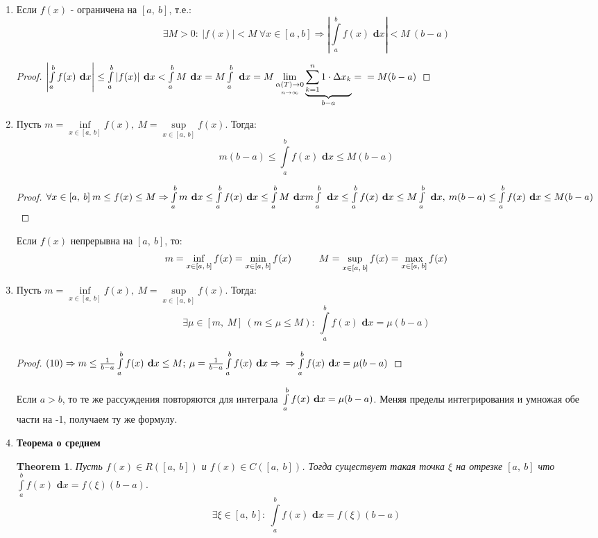 \documentclass[a4paper,12pt]{bookest}
\newtheorem{theorem}{Theorem}[section]
\theoremstyle{remark}
\newtheorem*{remark}{Remark}
\newcommand\tab[1][1cm]{\hspace*{#1}}
\newcommand\dx{\textbf{ d}x}
\begin{document}
\begin{enumerate}
\begin{proof}
	\end{proof}
	\begin{remark}
		Если $a>b;$ $$\left|\int\limits_{a}^{b}f(x)\dx\right|\leq\left|\int\limits_{a}^{b}|f(x)|\dx\right|$$
	\end{remark}
	\item Если $f(x)$ - ограничена на $[a,\>b]$, т.е.: $$\exists M>0:\>|f(x)|<M\>\forall x\in [a\>,b]\Rightarrow\left|\int\limits_a^bf(x)\dx\right|<M\>(b-a)$$
	\begin{proof}
	$\left|\int\limits_a^bf(x)\dx\right|\leq\int\limits_a^b|f(x)|\dx<\int\limits_a^bM\dx=M\int\limits_a^b\dx=M\lim\limits_{\underset{n\to\infty}{\alpha(T)\to0}}\underbrace{\sum\limits_{k=1}^n1\cdot\Delta x_k}_{b-a}=\\=M(b-a)$
	\end{proof}
	\item Пусть $m=\inf\limits_{x\in[a,\>b]}f(x),\>M=\sup\limits_{x\in[a,\>b]}f(x).$ Тогда:$$m(b-a)\leq\int\limits_{a}^{b}f(x)\dx\leq M(b-a)$$ \begin{proof}
		$\forall x\in[a,\>b]\>m\leq f(x)\leq M\Rightarrow\int\limits_{a}^{b}m\dx\leq \int\limits_{a}^{b}f(x)\dx\leq \int\limits_{a}^{b}M\dx\\m\int\limits_{a}^{b}\dx\leq\int\limits_{a}^{b}f(x)\dx\leq M\int\limits_{a}^{b}\dx,\>m(b-a)\leq \int\limits_{a}^{b}f(x)\dx\leq M(b-a)$
	\end{proof} 
	Если $f(x)$ непрерывна на $[a,\>b]$, то: $$m=\inf\limits_{x\in[a,\>b]}f(x)=\min\limits_{x\in[a,\>b]}f(x)\tab M=\sup\limits_{x\in[a,\>b]}f(x)=\max\limits_{x\in[a,\>b]}f(x)$$
	\item Пусть $m=\inf\limits_{x\in[a,\>b]}f(x),\>M=\sup\limits_{x\in[a,\>b]}f(x).$ Тогда: $$\exists\mu\in[m,\>M]\>(m\leq\mu\leq M):\>\int\limits_{a}^{b}f(x)\dx=\mu(b-a)$$ \begin{proof}
		$(10)\Rightarrow m\leq\frac1{b-a}\int\limits_{a}^{b}f(x)\dx\leq M;\>\mu=\frac1{b-a}\int\limits_{a}^{b}f(x)\dx\Rightarrow\\\Rightarrow\int\limits_{a}^{b}f(x)\dx=\mu(b-a)$
	\end{proof}
	Если $a>b$, то те же рассуждения повторяются для интеграла $\\\int\limits_{a}^{b}f(x)\dx=\mu(b-a)$. Меняя пределы интегрирования и умножая обе части на -1, получаем ту же формулу.
	\newpage
	\item \textbf{Теорема о среднем} \begin{theorem}
		Пусть $f(x)\in R([a,\>b])$ и $f(x)\in C([a,\>b])$. Тогда существует такая точка $\xi$ на отрезке $[a,\>b]$ что $\int\limits_{a}^{b}f(x)\dx=f(\xi)(b-a).$ $$\exists\xi\in[a,\>b]:\>\int\limits_{a}^{b}f(x)\dx=f(\xi)(b-a)$$

\end{theorem}
\end{enumerate}
\end{document}
